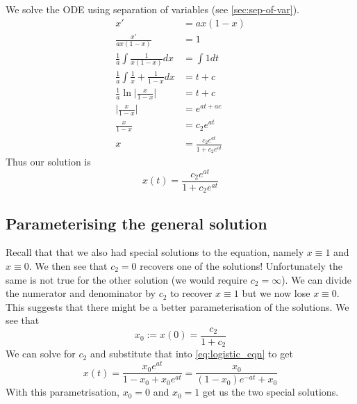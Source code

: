 We solve the ODE using separation of variables (see \autoref{sec:sep-of-var}).
\begin{align*}
    x' &= ax(1 - x)\\
    \frac{x'}{ax(1 - x)} &= 1\\
    \frac{1}{a} \int \frac{1}{x(1 - x)} dx &= \int 1 dt\\
    \frac{1}{a} \int \frac{1}{x} + \frac{1}{1 - x} dx &= t + c\\
    \frac{1}{a} \ln\bigg| \frac{x}{1- x} \bigg| &= t + c\\
    \bigg| \frac{x}{1- x} \bigg| &= e^{at + ac}\\
    \frac{x}{1 - x} &= c_2 e^{at}\\
    x &= \frac{c_2 e^{at}}{1 + c_2 e^{at}}
\end{align*}
Thus our solution is
\begin{equation}\label{eq:logistic_eqn}
    x(t) = \frac{c_2 e^{at}}{1 + c_2 e^{at}}
\end{equation}

\subsection{Parameterising the general solution}

Recall that that we also had special solutions to the equation, namely $x \equiv 1$ and $x \equiv 0$. We then see that $c_2 = 0$ recovers one of the solutions! Unfortunately the same is not true for the other solution (we would require $c_2 = \infty$). We can divide the numerator and denominator by $c_2$ to recover $x \equiv 1$ but we now lose $x \equiv 0$. This suggests that there might be a better parameterisation of the solutions. We see that 
$$ x_0 := x(0) = \frac{c_2}{1 + c_2} $$
We can solve for $c_2$ and substitute that into \autoref{eq:logistic_eqn} to get
\begin{equation}\label{eq:logistic_eqn2}
    x(t) = \frac{x_0 e^{at}}{1 - x_0 + x_0 e^{at}} = \frac{x_0}{(1 - x_0)e^{-at} + x_0}
\end{equation}
With this parametrisation, $x_0 = 0$ and $x_0 = 1$ get us the two special solutions.

